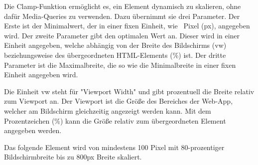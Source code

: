 \label{sec:clamp}

Die Clamp-Funktion ermöglicht es, ein Element dynamisch zu skalieren, ohne dafür Media-Queries zu verwenden. 
Dazu übernimmt sie drei Parameter. 
Der Erste ist der Minimalwert, der in einer fixen Einheit, wie \zb\ Pixel ({\ttfamily px}), angegeben wird. 
Der zweite Parameter gibt den optimalen Wert an. 
Dieser wird in einer Einheit angegeben, welche abhängig von der Breite des Bildschirms ({\ttfamily vw}) beziehungsweise des übergeordneten HTML-Elements ({\ttfamily \%}) ist. 
Der dritte Parameter ist die Maximalbreite, die so wie die Minimalbreite in einer fixen Einheit angegeben wird. 

Die Einheit {\ttfamily vw} steht für "Viewport Width" und gibt prozentuell die Breite relativ zum Viewport an. Der Viewport ist die Größe des Bereiches der Web-App, welcher am Bildschirm gleichzeitig angezeigt werden kann. 
Mit dem Prozentzeichen ({\ttfamily \%}) kann die Größe relativ zum übergeordneten Element angegeben werden.

Das folgende Element wird von mindestens 100 Pixel mit 80-prozentiger Bildschirmbreite bis zu 800px Breite skaliert.

